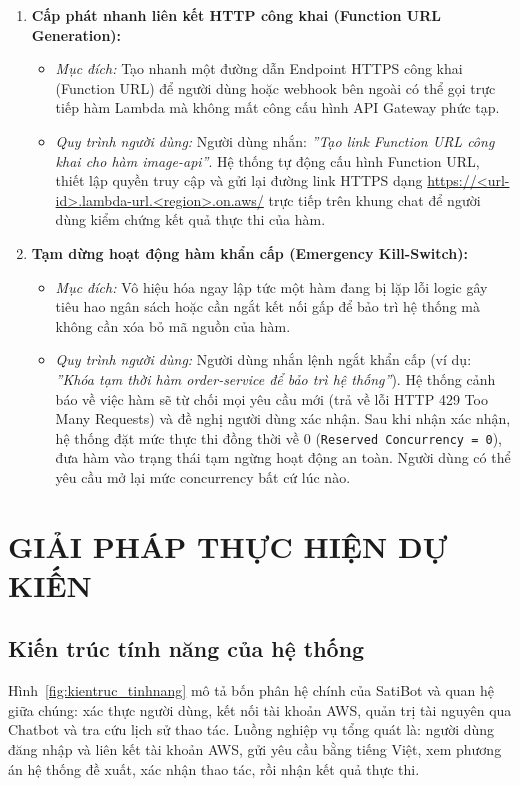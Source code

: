 \documentclass[a4paper,12pt]{article}
\begin{document}
\begin{enumerate}
  \item \textbf{Cấp phát nhanh liên kết HTTP công khai (Function URL Generation):}
  \begin{itemize}
    \item \textit{Mục đích:} Tạo nhanh một đường dẫn Endpoint HTTPS công khai (Function URL) để người dùng hoặc webhook bên ngoài có thể gọi trực tiếp hàm Lambda mà không mất công cấu hình API Gateway phức tạp.
    \item \textit{Quy trình người dùng:} Người dùng nhắn: \textit{''Tạo link Function URL công khai cho hàm image-api''}. Hệ thống tự động cấu hình Function URL, thiết lập quyền truy cập và gửi lại đường link HTTPS dạng \url{https://<url-id>.lambda-url.<region>.on.aws/} trực tiếp trên khung chat để người dùng kiểm chứng kết quả thực thi của hàm.
  \end{itemize}

  \item \textbf{Tạm dừng hoạt động hàm khẩn cấp (Emergency Kill-Switch):}
  \begin{itemize}
    \item \textit{Mục đích:} Vô hiệu hóa ngay lập tức một hàm đang bị lặp lỗi logic gây tiêu hao ngân sách hoặc cần ngắt kết nối gấp để bảo trì hệ thống mà không cần xóa bỏ mã nguồn của hàm.
    \item \textit{Quy trình người dùng:} Người dùng nhắn lệnh ngắt khẩn cấp (ví dụ: \textit{''Khóa tạm thời hàm order-service để bảo trì hệ thống''}). Hệ thống cảnh báo về việc hàm sẽ từ chối mọi yêu cầu mới (trả về lỗi HTTP 429 Too Many Requests) và đề nghị người dùng xác nhận. Sau khi nhận xác nhận, hệ thống đặt mức thực thi đồng thời về 0 (\texttt{Reserved Concurrency = 0}), đưa hàm vào trạng thái tạm ngừng hoạt động an toàn. Người dùng có thể yêu cầu mở lại mức concurrency bất cứ lúc nào.
  \end{itemize}
\end{enumerate}
\endgroup

\clearpage

\section{GIẢI PHÁP THỰC HIỆN DỰ KIẾN}

\subsection{Kiến trúc tính năng của hệ thống}

Hình~\ref{fig:kientruc_tinhnang} mô tả bốn phân hệ chính của SatiBot và quan hệ giữa chúng: xác thực người dùng, kết nối tài khoản AWS, quản trị tài nguyên qua Chatbot và tra cứu lịch sử thao tác. Luồng nghiệp vụ tổng quát là: người dùng đăng nhập và liên kết tài khoản AWS, gửi yêu cầu bằng tiếng Việt, xem phương án hệ thống đề xuất, xác nhận thao tác, rồi nhận kết quả thực thi.
\end{document}
